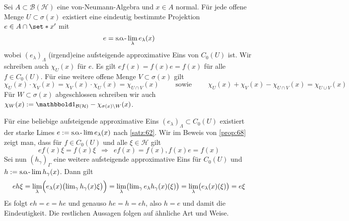 \begin{proposition}[label=prop:612,{name=[approximative Einsen in offener Teilmenge des Spektrums]}]
	Sei $A \subset \mathcal{B}(\mathcal{H})$ eine von-Neumann-Algebra und $x \in A$ normal.
	Für jede offene Menge $U \subset \sigma(x)$ existiert eine eindeutig bestimmte Projektion $e \in A \cap \set*{x}'$ mit 
	\[
		e=\solim_\lambda e_\lambda(x)
	\]
	wobei $(e_\lambda)_\Lambda$ (irgend)eine aufsteigende approximative Eins von $C_0(U)$ ist.
	Wir schreiben auch $\chi_U(x)$ für $e$.
	Es gilt $e f(x) = f(x) e = f(x)$ für alle $f \in C_0(U)$.
	Für eine weitere offene Menge $V \subset \sigma(x)$ gilt 
	\[
		\chi_U(x) \cdot \chi_V(x)=\chi_V(x) \cdot \chi_U(x) = \chi_{U \cap V}(x) \qquad\! \text{ sowie } \qquad\!\chi_U(x) + \chi_V(x) - \chi_{U \cap V}(x)= \chi_{U \cup V}(x) 
	\]
	Für $W \subset \sigma(x)$ abgeschlossen schreiben wir auch $\chi_W(x) := \ind_{\mathcal{B}(\mathcal{H})}-\chi_{\sigma(x)\setminus W}(x)$.
\end{proposition}
\begin{beweis}
	Für eine beliebige aufsteigende approximative Eins $(e_\lambda)_\Lambda \subset C_0(U)$ existiert der starke Limes $e := \solim e_\lambda(x)$ nach \autoref{satz:62}.
	Wir im Beweis von \autoref{prop:68} zeigt man, dass für $f \in C_0(U)$ und alle $\xi \in \mathcal{H}$ gilt
	\[
		e f(x) \xi = f(x) \xi \enspace\Longrightarrow\enspace e f(x) = f(x), f(x) e = f(x)
	\]
	Sei nun $(h_\gamma)_{\Gamma}$ eine weitere aufsteigende approximative Eins für $C_0(U)$ und $h := \solim h_\gamma(x)$.
	Dann gilt
	\[
		e h \xi = \lim_\lambda \enbrace[\Big]{e_\lambda(x) \enbrace[\big]{\lim\nolimits_\gamma h_\gamma(x) \xi}} = \lim_{\lambda} \enbrace[\big]{\lim\nolimits_\gamma e_\lambda h_\gamma(x)(\xi)}
		= \lim_\lambda \enbrace[\big]{e_\lambda(x)(\xi)} = e \xi
	\]
	Es folgt $ e h = e = h e$ und genauso $h e = h =eh$, also $h=e$ und damit die Eindeutigkeit. 
	Die restlichen Aussagen folgen auf ähnliche Art und Weise.
\end{beweis}

